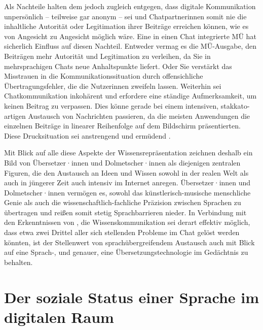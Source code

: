 Als Nachteile halten \citeauthor{doring_wissenskommunikation_2007} dem jedoch zugleich entgegen, dass digitale Kommunikation unpersönlich -- teilweise gar anonym -- sei und Chatpartner{\textperiodcentered}innen somit nie die inhaltliche Autorität oder Legitimation ihrer Beiträge erreichen können, wie es von Angesicht zu Angesicht möglich wäre. Eine in einen Chat integrierte MÜ hat sicherlich Einfluss auf diesen Nachteil. Entweder vermag es die MÜ-Ausgabe, den Beiträgen mehr Autorität und Legitimation zu verleihen, da Sie in mehrsprachigen Chats neue Anhaltspunkte liefert. Oder Sie verstärkt das Misstrauen in die Kommunikationssituation durch offensichliche Übertragungsfehler, die die Nutzer{\textperiodcentered}innen zweifeln lassen. Weiterhin sei Chatkommunikation inkohärent und erfordere eine ständige Aufmerksamkeit, um keinen Beitrag zu verpassen. Dies könne gerade bei einem intensiven, stakkato-artigen Austausch von Nachrichten passieren, da die meisten Anwendungen die einzelnen Beiträge in linearer Reihenfolge auf dem Bildschirm präsentierten. Diese Drucksituation sei anstrengend und ermüdend \citep[274\psqq]{doring_wissenskommunikation_2007}.

Mit Blick auf alle diese Aspekte der Wissensrepräsentation zeichnen deshalb \citet[297]{bernardini_language_2020} ein Bild von Übersetzer·innen und Dolmetscher·\linebreak[3]innen als diejenigen zentralen Figuren, die den Austausch an Ideen und Wissen sowohl in der realen Welt als auch in jüngerer Zeit auch intensiv im Internet anregen. Übersetzer·innen und Dolmetscher·innen vermögen es, sowohl das künstlerisch-musische menschliche Genie als auch die wissenschaftlich-fach\-liche Präzision zwischen Sprachen zu übertragen und reißen somit stetig Sprachbarrieren nieder. In Verbindung mit den Erkenntnissen von \citet[277\psq]{doring_wissenskommunikation_2007}, die Wissenskommunikation sei derart effektiv möglich, dass etwa zwei Drittel aller sich stellenden Probleme im Chat gelöst werden könnten, ist der Stellenwert von sprachübergreifendem Austausch auch mit Blick auf eine Sprach-, und genauer, eine Übersetzungstechnologie im Gedächtnis zu behalten.


\section{Der soziale Status einer Sprache im digitalen Raum}
\label{K2:sec:Status-Sprache-DigRaum}


